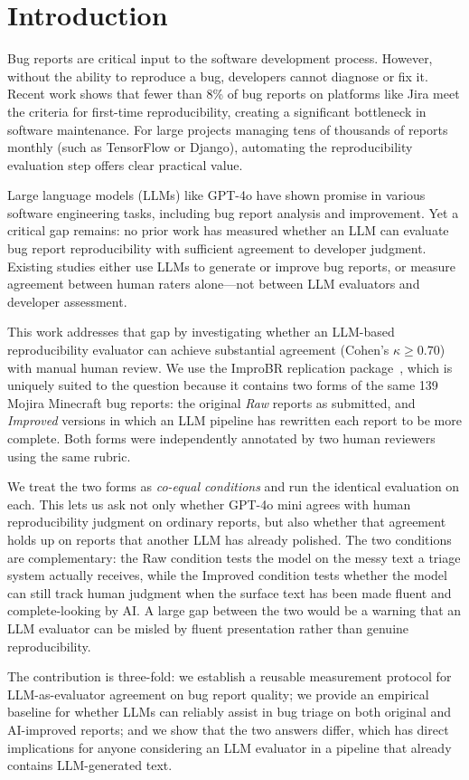 \section{Introduction}
\label{sec:intro}

Bug reports are critical input to the software development process. However, without the ability to reproduce a bug, developers cannot diagnose or fix it. Recent work shows that fewer than 8\% of bug reports on platforms like Jira meet the criteria for first-time reproducibility, creating a significant bottleneck in software maintenance. For large projects managing tens of thousands of reports monthly (such as TensorFlow or Django), automating the reproducibility evaluation step offers clear practical value.

Large language models (LLMs) like GPT-4o have shown promise in various software engineering tasks, including bug report analysis and improvement. Yet a critical gap remains: no prior work has measured whether an LLM can evaluate bug report reproducibility with sufficient agreement to developer judgment. Existing studies either use LLMs to generate or improve bug reports, or measure agreement between human raters alone---not between LLM evaluators and developer assessment.

This work addresses that gap by investigating whether an LLM-based reproducibility evaluator can achieve substantial agreement (Cohen's $\kappa \geq 0.70$) with manual human review. We use the ImproBR replication package~\cite{akyol2026improbr}, which is uniquely suited to the question because it contains two forms of the same 139 Mojira Minecraft bug reports: the original \emph{Raw} reports as submitted, and \emph{Improved} versions in which an LLM pipeline has rewritten each report to be more complete. Both forms were independently annotated by two human reviewers using the same rubric.

We treat the two forms as \emph{co-equal conditions} and run the identical evaluation on each. This lets us ask not only whether GPT-4o mini agrees with human reproducibility judgment on ordinary reports, but also whether that agreement holds up on reports that another LLM has already polished. The two conditions are complementary: the Raw condition tests the model on the messy text a triage system actually receives, while the Improved condition tests whether the model can still track human judgment when the surface text has been made fluent and complete-looking by AI. A large gap between the two would be a warning that an LLM evaluator can be misled by fluent presentation rather than genuine reproducibility.

The contribution is three-fold: we establish a reusable measurement protocol for LLM-as-evaluator agreement on bug report quality; we provide an empirical baseline for whether LLMs can reliably assist in bug triage on both original and AI-improved reports; and we show that the two answers differ, which has direct implications for anyone considering an LLM evaluator in a pipeline that already contains LLM-generated text.
